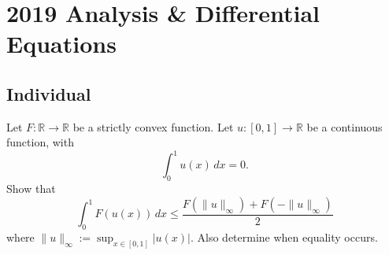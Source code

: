 \section{2019 Analysis \& Differential Equations}

\subsection{Individual}

\begin{exercise}
\label{analysis:2019:1}
Let $F:\mathbb{R}\to\mathbb{R}$ be a strictly convex function. Let $u:[0,1]\to\mathbb{R}$ be a continuous function, with
\[
\int_0^1 u(x)\,dx = 0.
\]
Show that
\[
\int_0^1 F(u(x))\,dx \leq \frac{F(\|u\|_{\infty}) + F(-\|u\|_{\infty})}{2}
\]
where $\|u\|_{\infty} := \sup_{x\in[0,1]}|u(x)|$. Also determine when equality occurs.
\end{exercise}

